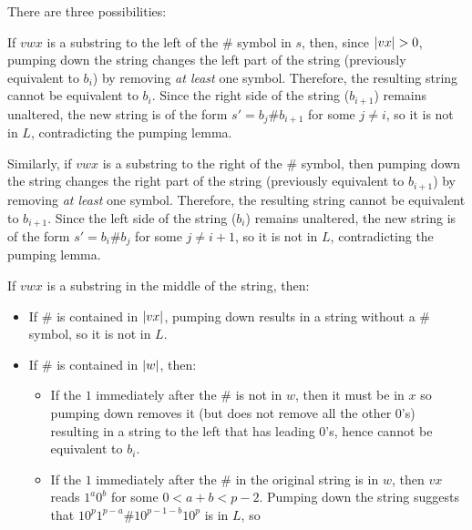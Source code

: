 \begin{problem}
\begin{enumalph}
\begin{Answer}
        There are three possibilities:
        \begin{enumroman}
          \item If $vwx$ is a substring to the left of the $\#$ symbol in $s$,
            then, since $\lvert vx\rvert > 0$, pumping down the string changes the left
            part of the string (previously equivalent to $b_i$)
            by removing \emph{at least} one symbol. Therefore, the resulting
            string cannot be equivalent to $b_i$. Since the right side of the string
            ($b_{i+1}$) remains unaltered, the new string is of the form
            $s' = b_j\#b_{i+1}$ for some $j \neq i$, so it is not in $L$,
            contradicting the pumping lemma.
          \item Similarly, if $vwx$ is a substring to the right of the $\#$ symbol,
            then pumping down the string changes the right part of the string
            (previously equivalent to $b_{i+1}$)
            by removing \emph{at least} one symbol. Therefore, the resulting
            string cannot be equivalent to $b_{i+1}$. Since the left side of the string
            ($b_i$) remains unaltered, the new string is of the form
            $s' = b_i\#b_j$ for some $j \neq i+1$, so it is not in $L$,
            contradicting the pumping lemma.
          \item If $vwx$ is a substring in the middle of the string, then:
            \begin{itemize}
              \item If $\#$ is contained in $\lvert vx\rvert$, pumping down
                results in a string without a $\#$ symbol, so it is not in $L$.
              \item If $\#$ is contained in $\lvert w\rvert$, then:
                \begin{itemize}
                  \item If the $1$ immediately after the $\#$ is not in $w$,
                    then it must be in $x$ so pumping down removes it
                    (but does not remove all the other $0$'s) resulting in a string
                    to the left that has leading $0$'s, hence cannot be equivalent
                    to $b_i$.
                  \newpage
                  \item If the $1$ immediately after the $\#$ in the original string
                    is in $w$, then $vx$ reads $1^a0^b$ for some $0 < a + b < p-2$.
                    Pumping down the string suggests that
                    $10^p1^{p-a}\#10^{p-1-b}10^p$ is in $L$, so

\end{itemize}
\end{itemize}
\end{enumroman}
\end{Answer}
\end{enumalph}
\end{problem}
